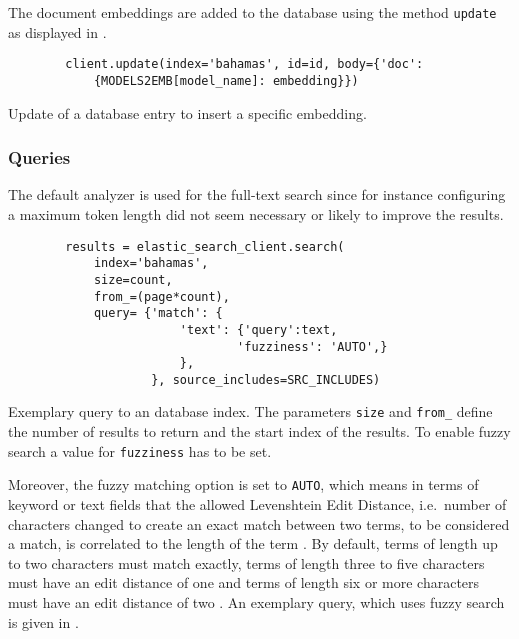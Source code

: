 The document embeddings are added to the database using the method \texttt{update} as displayed in .

\begin{listing}[htp]
    \begin{verbatim}
        client.update(index='bahamas', id=id, body={'doc': 
            {MODELS2EMB[model_name]: embedding}})
    \end{verbatim}
    \caption[Update of a database entry]
    {Update of a database entry to insert a specific embedding.
    }
    \label{lst:db_Pool_update}
\end{listing}


\subsubsection*{Queries}
The default analyzer is used for the full-text search since for instance configuring a maximum token length did not seem necessary or likely to improve the results.

\begin{listing}[htp]
    \begin{verbatim}
        results = elastic_search_client.search(
            index='bahamas', 
            size=count,
            from_=(page*count),
            query= {'match': {
                        'text': {'query':text,
                                'fuzziness': 'AUTO',}
                        }, 
                    }, source_includes=SRC_INCLUDES)
    \end{verbatim}
    \caption[Query to an \databaseName{} database index]{Exemplary query to an \databaseName{} database index.
    The parameters \texttt{size} and \texttt{from\_} define the number of results to return and the start index of the results.
    To enable fuzzy search a value for \texttt{fuzziness} has to be set. 
    }
    \label{lst:fuzzy_query}
\end{listing}

Moreover, the fuzzy matching option is set to \texttt{AUTO}, which means in terms of keyword or text fields that the allowed Levenshtein Edit Distance, 
i.e.\ number of characters changed to create an exact match between two terms, to be considered a match, is correlated to the length of the term \cite{Elasticsearch-guide}.
By default, terms of length up to two characters must match exactly, terms of length three to five characters must have an edit distance of one and 
terms of length six or more characters must have an edit distance of two \cite{Elasticsearch-guide}.
An exemplary query, which uses fuzzy search is given in .

